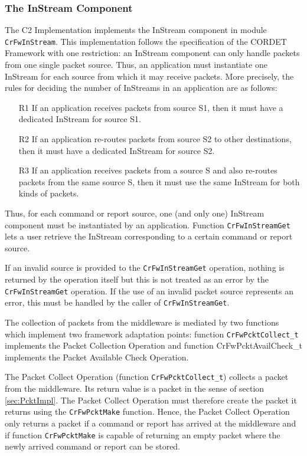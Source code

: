 \documentclass{pnp_article}
\begin{document}
\subsubsection{The InStream Component}\label{sec:InStream}


The C2 Implementation implements the InStream component in module \texttt{CrFwInStream}. This implementation follows the specification of the CORDET Framework with one restriction: an InStream component can only handle packets from one single packet source. Thus, an application must instantiate one InStream for each source from which it may receive packets. More precisely, the rules for deciding the number of InStreams in an application are as follows:

\begin{itemize}
\item[R1]{If an application receives packets from source S1, then it must have a dedicated InStream for source S1.}
\item[R2]{If an application re-routes packets from source S2 to other destinations, then it must have a dedicated InStream for source S2.}
\item[R3]{If an application receives packets from a source S and also re-routes packets from the same source S, then it must use the same InStream for both kinds of packets.}
\end{itemize}

Thus, for each command or report source, one (and only one) InStream component must be instantiated by an application. Function \texttt{CrFwInStreamGet} lets a user retrieve the InStream corresponding to a certain command or report source. 

If an invalid source is provided to the \texttt{CrFwInStreamGet} operation, nothing is returned by the operation itself but this is not treated as an error by the \texttt{CrFwInStreamGet} operation. If the use of an invalid packet source represents an error, this must be handled by the caller of \texttt{CrFwInStreamGet}.

The collection of packets from the middleware is mediated by two functions which implement two framework adaptation points: function \texttt{CrFwPcktCollect\_t} implements the Packet Collection Operation and function CrFwPcktAvailCheck\_t implements the Packet Available Check Operation. 

The Packet Collect Operation (function \texttt{CrFwPcktCollect\_t}) collects a packet from the middleware. Its return value is a packet in the sense of section \ref{sec:PcktImpl}. The Packet Collect Operation must therefore create the packet it returns using the \texttt{CrFwPcktMake} function. Hence, the Packet Collect Operation only returns a packet if a command or report has arrived at the middleware and if function \texttt{CrFwPcktMake} is capable of returning an empty packet where the newly arrived command or report can be stored. 
\end{document}

